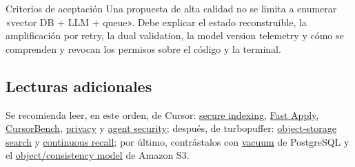\documentclass[a4paper]{article}
\begin{document}
\begin{knowledgebox}{Criterios de aceptación}
Una propuesta de alta calidad no se limita a enumerar «vector DB + LLM + queue». Debe explicar el estado reconstruible, la amplificación por retry, la dual validation, la model version telemetry y cómo se comprenden y revocan los permisos sobre el código y la terminal.
\end{knowledgebox}

\subsection{Lecturas adicionales}

Se recomienda leer, en este orden, de Cursor: \href{https://cursor.com/blog/secure-codebase-indexing}{secure indexing}, \href{https://cursor.com/blog/instant-apply}{Fast Apply}, \href{https://cursor.com/blog/cursorbench}{CursorBench}, \href{https://cursor.com/docs/enterprise/privacy-and-data-governance}{privacy} y \href{https://cursor.com/docs/agent/security}{agent security}; después, de turbopuffer: \href{https://turbopuffer.com/blog/turbopuffer}{object-storage search} y \href{https://turbopuffer.com/blog/continuous-recall}{continuous recall}; por último, contrástalos con \href{https://www.postgresql.org/docs/current/routine-vacuuming.html}{vacuum} de PostgreSQL y el \href{https://docs.aws.amazon.com/AmazonS3/latest/userguide/Welcome.html}{object/consistency model} de Amazon S3.
\end{document}
